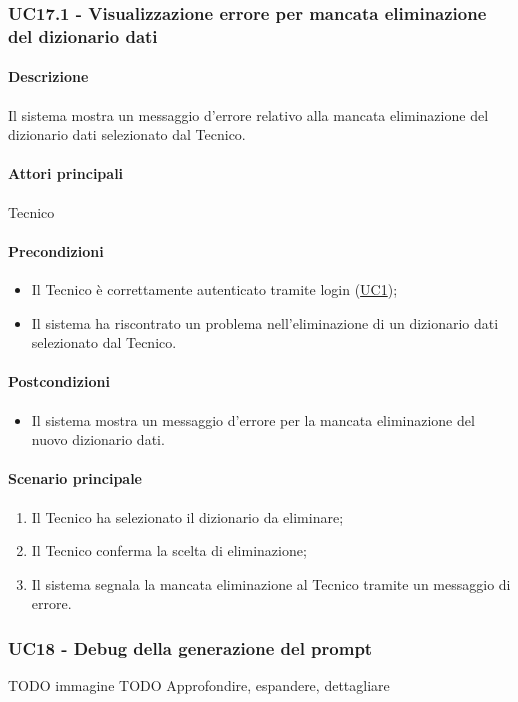 \subsubsection{UC17.1 - Visualizzazione errore per mancata eliminazione del dizionario dati}\label{UC17point1}
\paragraph*{Descrizione} Il sistema mostra un messaggio d’errore relativo alla mancata eliminazione del dizionario dati selezionato dal Tecnico.

\paragraph*{Attori principali} Tecnico
\paragraph*{Precondizioni}
\begin{itemize}
  \item Il Tecnico è correttamente autenticato tramite login (\hyperref[UC1]{UC1});
  \item Il sistema ha riscontrato un problema nell'eliminazione di un dizionario dati selezionato dal Tecnico.
\end{itemize}
\paragraph*{Postcondizioni}
\begin{itemize}
  \item Il sistema mostra un messaggio d’errore per la mancata eliminazione del nuovo dizionario dati.
\end{itemize}
\paragraph*{Scenario principale}
\begin{enumerate}
  \item Il Tecnico ha selezionato il dizionario da eliminare;
  \item Il Tecnico conferma la scelta di eliminazione;
  \item Il sistema segnala la mancata eliminazione al Tecnico tramite un messaggio di errore.
\end{enumerate}


\subsubsection{UC18 - Debug della generazione del prompt}\label{UC18}
TODO immagine
TODO Approfondire, espandere, dettagliare
